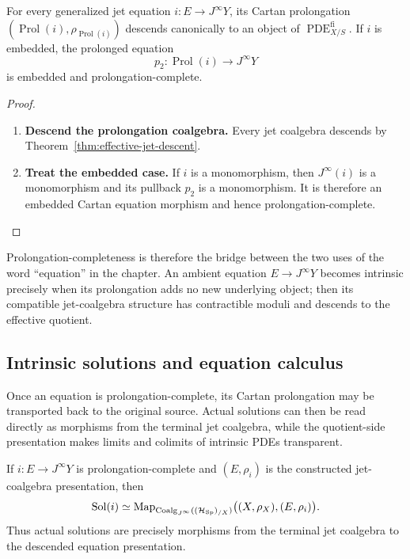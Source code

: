 \begin{corollary}
For every generalized jet equation \(i:E\to J^\infty Y\), its Cartan prolongation
\((\operatorname{Prol}(i),\rho_{\operatorname{Prol}(i)})\) descends canonically to an object of
\(\operatorname{PDE}^{\mathrm{fi}}_{X/S}\). If \(i\) is embedded, the prolonged equation
\[
  p_2:\operatorname{Prol}(i)\to J^\infty Y
\]
is embedded and prolongation-complete.
\end{corollary}

\begin{proof}
\leavevmode
\begin{enumerate}[label=\textup{(\arabic*)}]
    \item \textbf{Descend the prolongation coalgebra.}
Every jet coalgebra descends by Theorem~\ref{thm:effective-jet-descent}.

    \item \textbf{Treat the embedded case.}
If
\(i\) is a monomorphism, then \(J^\infty(i)\) is a monomorphism and its pullback \(p_2\) is
a monomorphism. It is therefore an embedded Cartan equation morphism and hence
prolongation-complete.
\end{enumerate}
\end{proof}

Prolongation-completeness is therefore the bridge between the two uses of the
word ``equation'' in the chapter. An ambient equation
\(E\to J^\infty Y\) becomes intrinsic precisely when its prolongation adds no
new underlying object; then its compatible jet-coalgebra structure has
contractible moduli and descends to the effective quotient.

\subsection{Intrinsic solutions and equation calculus}
\label{sec:intrinsic-equation-calculus}

Once an equation is prolongation-complete, its Cartan prolongation may be
transported back to the original source. Actual solutions can then be read
directly as morphisms from the terminal jet coalgebra, while the quotient-side
presentation makes limits and colimits of intrinsic PDEs transparent.
\begin{theorem}
\label{thm:solutions-intrinsically}
If \(i:E\to J^\infty Y\) is prolongation-complete and \((E,\rho_i)\) is the
constructed jet-coalgebra presentation, then
\[
  \operatorname{Sol}(i)
  \simeq
  \operatorname{Map}_{\operatorname{Coalg}_{J^\infty}((\mathcal H_{\operatorname{Sp}})_{/X})}
  \bigl((X,\rho_X),(E,\rho_i)\bigr).
\]
Thus actual solutions are precisely morphisms from the terminal jet coalgebra to
the descended equation presentation.
\end{theorem}

